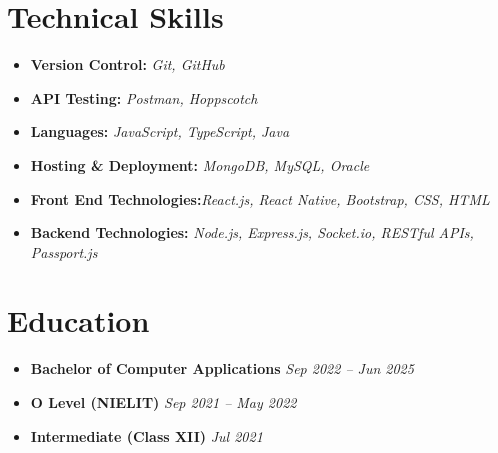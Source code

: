 \documentclass[a4paper,11pt]{article}
\begin{document}
\section*{Technical Skills}
\begin{itemize}[leftmargin=*]
    \item \textbf{Version Control:} \hfill \textit{Git, GitHub}
    \item \textbf{API Testing:} \hfill \textit{Postman, Hoppscotch}
    \item \textbf{Languages:} \hfill \textit{JavaScript, TypeScript, Java}
    \item \textbf{Hosting \& Deployment:} \hfill \textit{ MongoDB, MySQL, Oracle}
    \item \textbf{Front End Technologies:}\hfill \textit{React.js, React Native, Bootstrap, CSS, HTML}
    \item \textbf{Backend Technologies:}\hfill \textit{ Node.js, Express.js, Socket.io, RESTful APIs, Passport.js}
\end{itemize}

\section*{Education}
\begin{itemize}[leftmargin=*]
    \item \textbf{Bachelor of Computer Applications} \hfill \textit{Sep 2022 – Jun 2025} \\
    
    \item \textbf{O Level (NIELIT)} \hfill \textit{Sep 2021 – May 2022} \\
    
    \item \textbf{Intermediate (Class XII)} \hfill \textit{Jul 2021} \\
\end{itemize}



\end{document}
